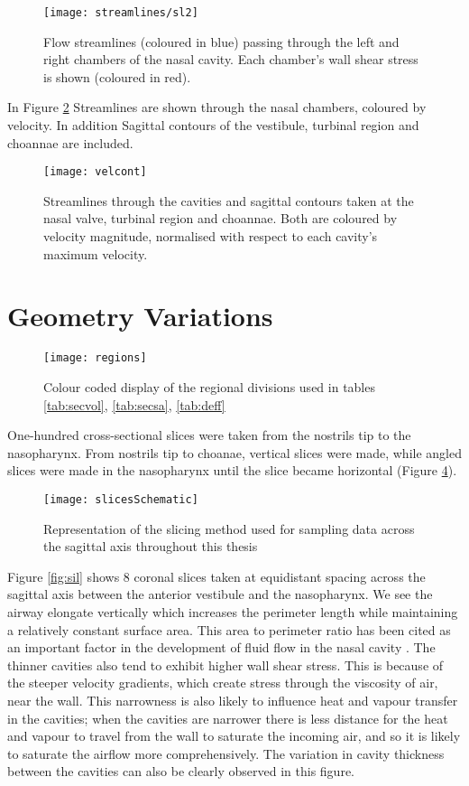 \begin{figure} 
  \texttt{[image: streamlines/sl2]}
    \caption{Flow streamlines (coloured in blue) passing through the left and right chambers of the nasal cavity. Each chamber’s wall shear stress is shown (coloured in red).}
    \label{fig:vsl}
  \end{figure}

  In Figure \ref{fig:velcont} Streamlines are shown through the nasal chambers, coloured by velocity. In addition Sagittal contours of the vestibule, turbinal region and choannae are included.
\begin{figure} 
  \texttt{[image: velcont]}
  \caption{Streamlines through the cavities and sagittal contours taken at the nasal valve, turbinal region and choannae. Both are coloured by velocity magnitude, normalised with respect to each cavity's maximum velocity.}
  \label{fig:velcont}
\end{figure}

\section{Geometry Variations}


\begin{figure}
\centering
\texttt{[image: regions]}
\caption{Colour coded display of the regional divisions used in tables \ref{tab:secvol}, \ref{tab:secsa}, \ref{tab:deff}} 
\label{fig:regions}
\end{figure} 

One-hundred cross-sectional slices were taken from the nostrils tip to the nasopharynx. From nostrils tip to choanae, vertical slices were made, while angled slices were made in the nasopharynx until the slice became horizontal (Figure \ref{fig:Slices}).


\begin{figure} 
\centering
\texttt{[image: slicesSchematic]}
\caption{Representation of the slicing method used for sampling data across the sagittal axis throughout this thesis} 
\label{fig:Slices}
\end{figure}

Figure \ref{fig:sil} shows 8 coronal slices taken at equidistant spacing across the sagittal axis between the anterior vestibule and the nasopharynx. We see the airway elongate vertically which increases the perimeter length while maintaining a relatively constant surface area. This area to perimeter ratio has been cited as an important factor in the development of fluid flow in the nasal cavity \cite{Garcia2007, Xi2012}. The thinner cavities also tend to exhibit higher wall shear stress. This is because of the steeper velocity gradients, which create stress through the viscosity of air, near the wall. This narrowness is also likely to influence heat and vapour transfer in the cavities; when the cavities are narrower there is less distance for the heat and vapour to travel from the wall to saturate the incoming air, and so it is likely to saturate the airflow more comprehensively. The variation in cavity thickness between the cavities can also be clearly observed in this figure.


